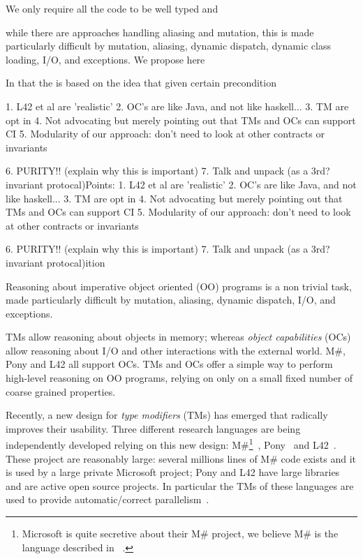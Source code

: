\LINE


We only require all the code to be well typed and 


 while 
there are approaches handling aliasing and mutation,
this is made particularly difficult by mutation, aliasing, dynamic dispatch, dynamic class loading,
I/O, and exceptions.
We propose here 

In
that the 
is based on the idea that 
given certain precondition


1. L42 et al are 'realistic'
2. OC's are like Java, and not like haskell...
3. TM are opt in
4. Not advocating but merely pointing out that TMs and OCs can support CI
5. Modularity of our approach: don't need to look at other contracts or invariants

6. PURITY!! (explain why this is important)
7. Talk and unpack (as a 3rd? invariant protocal)Points:
1. L42 et al are 'realistic'
2. OC's are like Java, and not like haskell...
3. TM are opt in
4. Not advocating but merely pointing out that TMs and OCs can support CI
5. Modularity of our approach: don't need to look at other contracts or invariants

6. PURITY!! (explain why this is important)
7. Talk and unpack (as a 3rd? invariant protocal)ition




\LINE
Reasoning about imperative object oriented (OO) programs is a non trivial task,
made particularly difficult by mutation, aliasing, dynamic dispatch, I/O, and exceptions.

TMs allow reasoning about objects in memory; whereas
\emph{object capabilities} (OCs) allow reasoning about
I/O and other interactions with the external world.
M\#, Pony and L42 all support OCs.
TMs and OCs offer a simple way to perform high-level reasoning on OO programs, relying on only on a small fixed number of coarse grained properties.

Recently, a new design for \emph{type modifiers} (TMs) has emerged that radically improves their usability.
Three different research languages are being independently developed relying on this new design: {M\#}\footnote{Microsoft is quite secretive about their M\# project, we believe M\# is the language described in ~\cite{?}.}~\cite{?}, Pony~\cite{?} and L42~\cite{?}.
These project are reasonably large: several millions lines of M\# code exists and it is used by a large private Microsoft project; Pony and L42 have large libraries and are active open source projects. In particular the TMs of these languages are used to provide automatic/correct parallelism~\cite{GordonEtAl12,clebsch2015deny,clebsch2017orca,?}.

